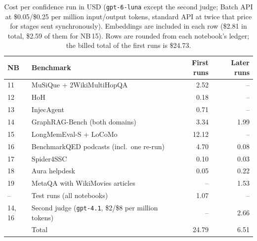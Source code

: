 \documentclass[11pt,a4paper]{article}
\newcommand{\nb}[1]{NB\,#1}
\begin{document}
\begin{table}[H]
\centering
\small
\caption{Cost per confidence run in USD (\texttt{gpt-6-luna} except the second judge; Batch API at \$0.05/\$0.25 per million input/output tokens,
standard API at twice that price for stages sent synchronously). Embeddings are included in each row (\$2.81 in total,
\$2.59 of them for \nb{15}). Rows are rounded from each notebook's ledger; the billed total of the first runs is
\$24.73.}
\label{tab:cost}
\begin{tabular}{@{}llrr@{}}
\toprule
NB & Benchmark & First runs & Later runs \\
\midrule
11 & MuSiQue + 2WikiMultiHopQA & 2.52 & -- \\
12 & HoH & 0.18 & -- \\
13 & InjecAgent & 0.71 & -- \\
14 & GraphRAG-Bench (both domains) & 3.34 & 1.99 \\
15 & LongMemEval-S + LoCoMo & 12.12 & -- \\
16 & BenchmarkQED podcasts (incl.\ one re-run) & 4.70 & 0.08 \\
17 & Spider4SSC & 0.10 & 0.03 \\
18 & Aura helpdesk & 0.05 & 0.22 \\
19 & MetaQA with WikiMovies articles & -- & 1.53 \\
-- & Test runs (all notebooks) & 1.07 & -- \\
14, 16 & Second judge (\texttt{gpt-4.1}, \$2/\$8 per million tokens) & -- & 2.66 \\
\midrule
 & Total & 24.79 & 6.51 \\
\bottomrule
\end{tabular}
\end{table}



\end{document}

